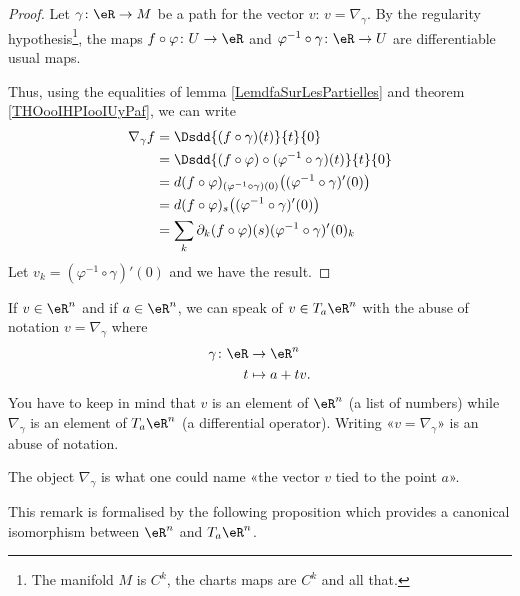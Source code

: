 \begin{proof}
    Let \( \gamma\colon \eR\to M\) be a path for the vector \( v\): \( v=\nabla_{\gamma}\). By the regularity hypothesis\footnote{The manifold \( M\) is \( C^k\), the charts maps are \( C^k\) and all that.}, the maps \( f\circ \varphi\colon U\to \eR\) and \( \varphi^{-1}\circ\gamma\colon \eR \to U \) are differentiable usual maps.

    Thus, using the equalities of lemma \ref{LemdfaSurLesPartielles} and theorem \ref{THOooIHPIooIUyPaf}, we can write
    \begin{subequations}
        \begin{align}
            \nabla_{\gamma}f&=\Dsdd{ (f\circ\gamma)(t) }{t}{0}\\
            &=\Dsdd{ (f\circ\varphi)\circ(\varphi^{-1}\circ\gamma)(t) }{t}{0}\\
            &=d(f\circ \varphi)_{(\varphi^{-1}\circ\gamma)(0)}\big( (\varphi^{-1}\circ\gamma)'(0) \big)\\
            &=d(f\circ \varphi)_{s}\big( (\varphi^{-1}\circ\gamma)'(0) \big)\\
            &=\sum_k\partial_k(f\circ \varphi)(s)(\varphi^{-1}\circ\gamma)'(0)_k
        \end{align}
    \end{subequations}
    Let \( v_k=(\varphi^{-1}\circ\gamma)'(0)\) and we have the result.
\end{proof}

\begin{normaltext}      \label{NORMooXAJGooDNyxjv}
    If \( v\in \eR^n\) and if \( a\in \eR^n\), we can speak of \( v\in T_a\eR^n\) with the abuse of notation \( v=\nabla_{\gamma}\) where
    \begin{equation}
        \begin{aligned}
            \gamma\colon \eR&\to \eR^n \\
            t&\mapsto a+tv.
        \end{aligned}
    \end{equation}
    You have to keep in mind that \( v\) is an element of \( \eR^n\) (a list of numbers) while \( \nabla_{\gamma}\) is an element of \( T_a\eR^n\) (a differential operator). Writing «\( v=\nabla_{\gamma}\)» is an abuse of notation.

    The object \( \nabla_{\gamma}\) is what one could name «the vector \( v\) tied to the point \( a\)».
\end{normaltext}

This remark is formalised by the following proposition which provides a canonical isomorphism between \( \eR^n\) and \( T_a\eR^n\).

